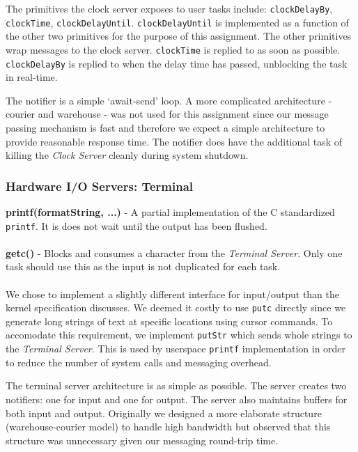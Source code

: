 \documentclass[twoside,a4paper]{refart}
\begin{document}
The primitives the clock server exposes to user tasks include: \verb~clockDelayBy~, \verb~clockTime~, \verb~clockDelayUntil~. \verb~clockDelayUntil~ is implemented as a function of the other two primitives for the purpose of this assignment. The other primitives wrap messages to the clock server. \verb~clockTime~ is replied to as soon as possible. \verb~clockDelayBy~ is replied to when the delay time has passed, unblocking the task in real-time.

The notifier is a simple ‘await-send’ loop. A more complicated architecture - courier and warehouse - was not used for this assignment since our message passing mechanism is fast and therefore we expect a simple architecture to provide reasonable response time. The notifier does have the additional task of killing the \textit{Clock Server} cleanly during system shutdown.

\subsubsection{Hardware I/O Servers: Terminal}

\textbf{printf(formatString, ...)} - A partial implementation of the C standardized \verb~printf~. It is does not wait until the output has been flushed.\\\\
\textbf{getc()} - Blocks and consumes a character from the \textit{Terminal Server}. Only one task should use this as the input is not duplicated for each task.\\\\

We chose to implement a slightly different interface for input/output than the kernel specification discusses. We deemed it costly to use \verb~putc~ directly since we generate long strings of text at specific locations using cursor commands. To accomodate this requirement, we implement \verb~putStr~ which sends whole strings to the \textit{Terminal Server}. This is used by userspace \verb~printf~ implementation in order to reduce the number of system calls and messaging overhead.

The terminal server architecture is as simple as possible. The server creates two notifiers: one for input and one for output. The server also maintains buffers for both input and output. Originally we designed a more elaborate structure (warehouse-courier model) to handle high bandwidth but observed that this structure was unnecessary given our messaging round-trip time.
\end{document}
